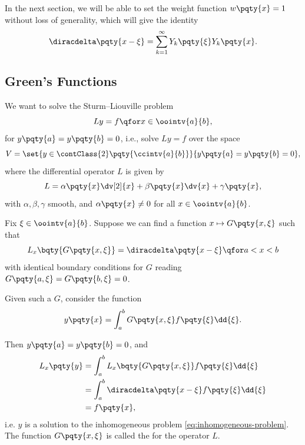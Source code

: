 \begin{remark}
    In the next section, we will be able to set the weight function \(w\pqty{x} = 1\) without loss of generality, which will give the identity
    \begin{equation}
        \diracdelta\pqty{x - \xi} = \sum_{k = 1}^{\infty} Y_k\pqty{\xi} Y_k\pqty{x}.
    \end{equation}
\end{remark}

\subsection{Green's Functions}

We want to solve the Sturm--Liouville problem
\begin{equation}
    \label{eq:inhomogeneous-problem}%
    L y = f \qfor x \in \oointv{a}{b},
\end{equation}
for \(y\pqty{a} = y\pqty{b} = 0\), i.e., solve \(Ly = f\) over the space
\begin{equation}
    V = \set{y \in \contClass{2}\pqty{\ccintv{a}{b}}}{y\pqty{a} = y\pqty{b} = 0},
\end{equation}
where the differential operator \(L\) is given by
\begin{equation}
    L = \alpha\pqty{x} \dv[2]{x} + \beta\pqty{x} \dv{x} + \gamma\pqty{x},
\end{equation}
with \(\alpha, \beta, \gamma\) smooth, and \(\alpha\pqty{x} \neq 0\) for all \(x \in \oointv{a}{b}\).

Fix \(\xi \in \oointv{a}{b}\). Suppose we can find a function \(x \mapsto G\pqty{x, \xi}\) such that
\begin{equation}
    L_x \bqty{G\pqty{x, \xi}} = \diracdelta\pqty{x - \xi} \qfor a < x < b
\end{equation}
with identical boundary conditions for \(G\) reading \(G\pqty{a, \xi} = G\pqty{b, \xi} = 0\).

Given such a \(G\), consider the function
\begin{equation}
    y\pqty{x} = \int_{a}^{b} G\pqty{x, \xi} f\pqty{\xi} \dd{\xi}.
\end{equation}

Then \(y\pqty{a} = y\pqty{b} = 0\), and 
\begin{subequations}
    \begin{align}
        L_x\pqty{y} &= \int_{a}^{b} L_x \bqty{G\pqty{x, \xi}} f\pqty{\xi} \dd{\xi} \\
        &= \int_{a}^{b} \diracdelta\pqty{x - \xi} f\pqty{\xi} \dd{\xi} \\
        &= f\pqty{x},
    \end{align}
\end{subequations}
i.e. \(y\) is a solution to the inhomogeneous problem \eqref{eq:inhomogeneous-problem}. The function \(G\pqty{x, \xi}\) is called the  for the operator \(L\).

